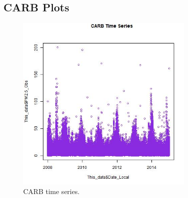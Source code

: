 
\subsection*{CARB Plots}
\begin{figure} 
\centering 
\includegraphics[width=0.77\textwidth]{Code_Outputs/CARB_time_series.jpg} 
\caption{\label{fig:CARBTS}CARB time series.} 
\end{figure} 
 
